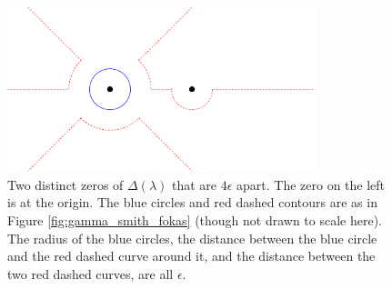 \documentclass[12pt, oneside, a4paper]{article}
\begin{document}
\begin{figure}[htpb!]
    \centering
    \includegraphics[width=0.8\textwidth]{epsilon_2_ps.png}
    \caption{Two distinct zeros of $\Delta(\lambda)$ that are $4\epsilon$ apart. The zero on the left is at the origin. The blue circles and red dashed contours are as in Figure \ref{fig:gamma_smith_fokas} (though not drawn to scale here). The radius of the blue circles, the distance between the blue circle and the red dashed curve around it, and the distance between the two red dashed curves, are all $\epsilon$.}
    \label{fig:epsilon_2}
\end{figure}
\end{document}
